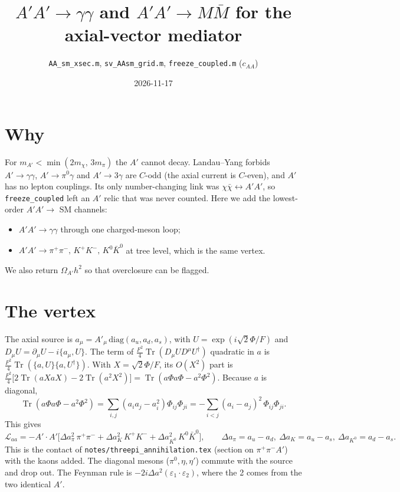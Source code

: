 \documentclass{article}
\title{$A'A'\to\gamma\gamma$ and $A'A'\to M\bar M$ for the axial-vector mediator}
\author{\texttt{AA\_sm\_xsec.m}, \texttt{sv\_AAsm\_grid.m}, \texttt{freeze\_coupled.m} ($c_{AA}$)}
\date{2026-11-17}
\newcommand{\tr}{\operatorname{Tr}}
\newcommand{\Da}{\Delta a}
\newcommand{\mpi}{m_\pi}
\begin{document}
\maketitle

\section{Why}

For $m_{A'}<\min(2m_\chi,\,3\mpi)$ the $A'$ cannot decay. Landau--Yang forbids $A'\to\gamma\gamma$,
$A'\to\pi^0\gamma$ and $A'\to3\gamma$ are $C$-odd (the axial current is $C$-even), and $A'$ has no
lepton couplings. Its only number-changing link was $\chi\bar\chi\leftrightarrow A'A'$, so
\texttt{freeze\_coupled} left an $A'$ relic that was never counted. Here we add the lowest-order
$A'A'\to$ SM channels:
\begin{itemize}
\item $A'A'\to\gamma\gamma$ through one charged-meson loop;
\item $A'A'\to\pi^+\pi^-,\,K^+K^-,\,K^0\bar K^0$ at tree level, which is the same vertex.
\end{itemize}
We also return $\Omega_{A'}h^2$ so that overclosure can be flagged.

\section{The vertex}

The axial source is $a_\mu=A'_\mu\,\mathrm{diag}(a_u,a_d,a_s)$, with
$U=\exp(i\sqrt2\Phi/F)$ and $D_\mu U=\partial_\mu U-i\{a_\mu,U\}$. The term of
$\tfrac{F^2}{4}\tr(D_\mu UD^\mu U^\dagger)$ quadratic in $a$ is
$\tfrac{F^2}{4}\tr(\{a,U\}\{a,U^\dagger\})$. With $X=\sqrt2\Phi/F$, its $O(X^2)$ part is
$\tfrac{F^2}{4}\big[2\tr(aXaX)-2\tr(a^2X^2)\big]=\tr(a\Phi a\Phi-a^2\Phi^2)$. Because $a$ is
diagonal,
\begin{equation}
\tr(a\Phi a\Phi-a^2\Phi^2)=\sum_{i,j}(a_ia_j-a_i^2)\Phi_{ij}\Phi_{ji}
=-\sum_{i<j}(a_i-a_j)^2\,\Phi_{ij}\Phi_{ji}.
\end{equation}
This gives
\begin{equation}
\boxed{\mathcal L_{aa}=-A'\!\cdot\!A'\Big[\Da_\pi^2\,\pi^+\pi^-+\Da_K^2\,K^+K^-+\Da_{K^0}^2\,K^0\bar K^0\Big]},
\qquad \Da_\pi=a_u-a_d,\ \Da_K=a_u-a_s,\ \Da_{K^0}=a_d-a_s .
\end{equation}
This is the contact of \texttt{notes/threepi\_annihilation.tex} (section on $\pi^+\pi^-A'$) with the kaons
added. The diagonal mesons ($\pi^0,\eta,\eta'$) commute with the source and drop out. The
Feynman rule is $-2i\Da^2(\varepsilon_1\!\cdot\!\varepsilon_2)$, where the 2 comes from the two
identical $A'$.
\end{document}
